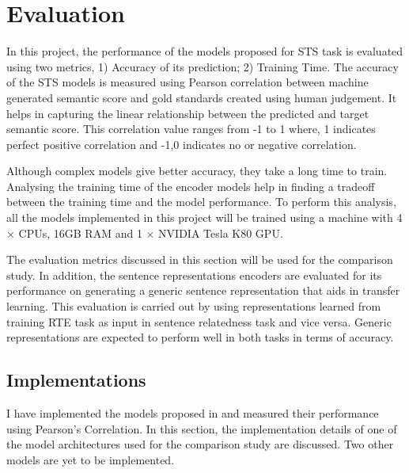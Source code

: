 \documentclass[12pt]{report} %
\begin{document}
\chapter{Evaluation}
In this project, the performance of the models proposed for STS task is evaluated using two metrics, 1) Accuracy of its prediction; 2) Training Time. The accuracy of the STS models is measured using Pearson correlation between machine generated semantic score and gold standards created using human judgement. It helps in capturing the linear relationship between the predicted and target semantic score. This correlation value ranges from -1 to 1 where, 1 indicates perfect positive correlation and -1,0 indicates no or negative correlation. 
 
 Although complex models give better accuracy, they take a long time to train. Analysing the training time of the encoder models help in finding a tradeoff between the training time and the model performance. To perform this analysis, all the models implemented in this project will be trained using a machine with 4 $\times$ CPUs, 16GB RAM and 1 $\times$ NVIDIA Tesla K80 GPU.  

The evaluation metrics discussed in this section will be used for the comparison study. In addition, the sentence representations encoders are evaluated for its performance on generating a generic sentence representation that aids in transfer learning. This evaluation is carried out by using representations learned from training RTE task as input in sentence relatedness task and vice versa. Generic representations are expected to perform well in both tasks in terms of accuracy.
	   

	 

\section{Implementations}
I have implemented the models proposed in \cite{shao2017hcti} and measured their performance using Pearson's Correlation. In this section, the implementation details of one of the model architectures used for the comparison study are discussed. Two other models are yet to be implemented.
	
\end{document}
